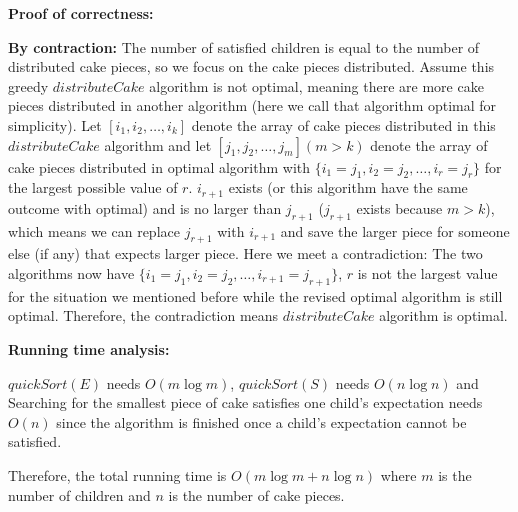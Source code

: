 \documentclass{article}
\begin{document}
{\par\textbf{Proof of correctness: }
\par\textbf{By contraction: }The number of satisfied children is equal to the number of distributed cake pieces, so we focus on the cake pieces distributed. Assume this greedy $distributeCake$ algorithm is not optimal, meaning there are more cake pieces distributed in another algorithm (here we call that algorithm optimal for simplicity). Let $[i_1, i_2, \ldots, i_k]$ denote the array of cake pieces distributed in this $distributeCake$ algorithm and let $[j_1, j_2, \ldots, j_m](m>k)$ denote the array of cake pieces distributed in optimal algorithm with $\{i_1 = j_1, i_2 = j_2, \ldots, i_r = j_r\}$ for the largest possible value of $r$. $i_{r+1}$ exists (or this algorithm have the same outcome with optimal) and is no larger than $j_{r+1}$ ($j_{r+1}$ exists because $m>k$), which means we can replace $j_{r+1}$ with $i_{r+1}$ and save the larger piece for someone else (if any) that expects larger piece. Here we meet a contradiction: The two algorithms now have $\{i_1 = j_1, i_2 = j_2, \ldots, i_{r+1} = j_{r+1}\}$, $r$ is not the largest value for the situation we mentioned before while the revised optimal algorithm is still optimal. Therefore, the contradiction means $distributeCake$ algorithm is optimal.\\

\par\textbf{Running time analysis: }
\par $quickSort(E)$ needs $O(m\log m)$, $quickSort(S)$ needs $O(n\log n)$ and Searching for the smallest piece of cake satisfies one child's expectation needs $O(n)$ since the algorithm is finished once a child's expectation cannot be satisfied.
\par Therefore, the total running time is $O(m\log m + n\log n)$ where $m$ is the number of children and $n$ is the number of cake pieces. 
}

\pagebreak
\end{document}
